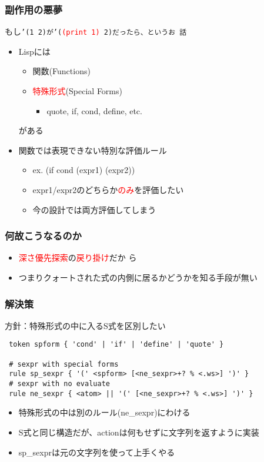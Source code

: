 \documentclass[14pt,dvipdfm,trans]{beamer}
\begin{document}
\begin{frame}
 \frametitle{副作用の悪夢}
 もし\tt{'(1 2)}が\tt{'(\textcolor{red}{(print 1)} 2)}だったら、というお
 話\\
\pause
\begin{itemize}
 \item Lispには
\begin{itemize}
 \item 関数(Functions) \pause
 \item \textcolor{red}{特殊形式}(Special Forms)
       \begin{itemize}
	\item quote, if, cond, define, etc.
       \end{itemize}
\end{itemize}
\hspace*{12zh}がある
\vspace{1zh}
\pause[4]
 \item 関数では表現できない特別な評価ルール
       \begin{itemize}
	\item <5-> ex. (if cond (expr1) (expr2))
	\item <6-> expr1/expr2のどちらか\textcolor{red}{のみ}を評価したい
	\item <7-> 今の設計では両方評価してしまう
       \end{itemize}
\end{itemize}
\end{frame}

\begin{frame}
\frametitle{何故こうなるのか}
\begin{itemize}
 \item <2-> \textcolor{red}{深さ優先探索}の\textcolor{red}{戻り掛け}だか
       ら
 \vspace{1zh}
 \item <3-> つまりクォートされた式の内側に居るかどうかを知る手段が無い
\end{itemize}
\vspace{3zh}
\end{frame}

\begin{frame}[fragile]
 \frametitle{解決策}
 \pause
 方針：特殊形式の中に入るS式を区別したい
 \vspace{1zh}
 \pause
 \begin{lstlisting}
 token spform { 'cond' | 'if' | 'define' | 'quote' }

 # sexpr with special forms
 rule sp_sexpr { '(' <spform> [<ne_sexpr>+? % <.ws>] ')' }
 # sexpr with no evaluate
 rule ne_sexpr { <atom> || '(' [<ne_sexpr>+? % <.ws>] ')' }
 \end{lstlisting}
\begin{itemize}
 \item <4-> 特殊形式の中は別のルール(ne\_sexpr)にわける
 \item <5-> S式と同じ構造だが、actionは何もせずに文字列を返すように実装
 \item <6-> sp\_sexprは元の文字列を使って上手くやる
\end{itemize}
\end{frame}
\end{document}
